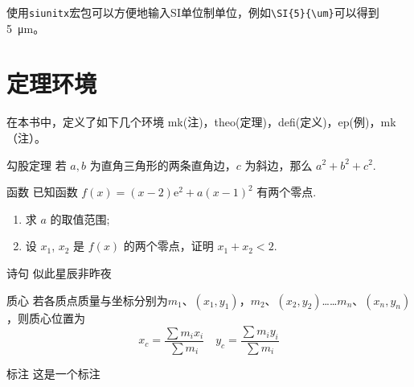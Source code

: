 \documentclass{gbook}
\begin{document}
使用\verb+siunitx+宏包可以方便地输入SI单位制单位，例如\verb+\SI{5}{\um}+可以得到\SI{5}{\um}。

\section{定理环境}

在本书中，定义了如下几个环境
mk(注)，theo(定理)，defi(定义)，ep(例)，mk（注）。

\begin{theo}{勾股定理}{}
若 $a,b$ 为直角三角形的两条直角边，$c$ 为斜边，那么 $a^2 + b^2 + c^2.$
\end{theo}

\begin{qu}{函数}{}
已知函数 $ f(x) = (x - 2)\mathrm{e}^{2} + a (x - 1)^{2} $ 有两个零点.
\begin{enumerate}[label=(\arabic*)]
  \item 求 $ a $ 的取值范围;
  \item 设 $ x_{1} $, $ x_{2} $ 是 $ f(x) $ 的两个零点，证明 $ x_{1} + x_{2} < 2 $.
\end{enumerate}
\end{qu}

\begin{ep}{诗句}{}
似此星辰非昨夜
\end{ep}

\begin{defi}{质心}{}
若各质点质量与坐标分别为$m_1$、$(x_1,y_1)$，$m_2$、$(x_2,y_2)$……$m_n$、$(x_n,y_n)$，则质心位置为
$$x_c = \frac{\sum m_i x_i}{\sum m_i} \quad y_c = \frac{\sum m_i y_i}{\sum m_i}$$
\end{defi}

\begin{mk}{标注}{}
这是一个标注
\end{mk}


\end{document}
